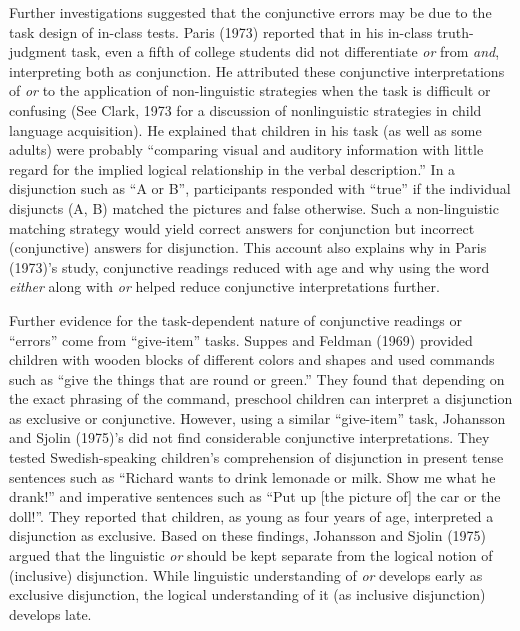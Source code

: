 \documentclass[,man,floatsintext]{apa6}
\begin{document}
Further investigations suggested that the conjunctive errors may be due to the task design of in-class tests. Paris (1973) reported that in his in-class truth-judgment task, even a fifth of college students did not differentiate \emph{or} from \emph{and}, interpreting both as conjunction. He attributed these conjunctive interpretations of \emph{or} to the application of non-linguistic strategies when the task is difficult or confusing (See Clark, 1973 for a discussion of nonlinguistic strategies in child language acquisition). He explained that children in his task (as well as some adults) were probably \enquote{comparing visual and auditory information with little regard for the implied logical relationship in the verbal description.} In a disjunction such as \enquote{A or B}, participants responded with \enquote{true} if the individual disjuncts (A, B) matched the pictures and false otherwise. Such a non-linguistic matching strategy would yield correct answers for conjunction but incorrect (conjunctive) answers for disjunction. This account also explains why in Paris (1973)'s study, conjunctive readings reduced with age and why using the word \emph{either} along with \emph{or} helped reduce conjunctive interpretations further.

Further evidence for the task-dependent nature of conjunctive readings or \enquote{errors} come from \enquote{give-item} tasks. Suppes and Feldman (1969) provided children with wooden blocks of different colors and shapes and used commands such as \enquote{give the things that are round or green.} They found that depending on the exact phrasing of the command, preschool children can interpret a disjunction as exclusive or conjunctive. However, using a similar \enquote{give-item} task, Johansson and Sjolin (1975)'s did not find considerable conjunctive interpretations. They tested Swedish-speaking children's comprehension of disjunction in present tense sentences such as \enquote{Richard wants to drink lemonade or milk. Show me what he drank!} and imperative sentences such as \enquote{Put up {[}the picture of{]} the car or the doll!}. They reported that children, as young as four years of age, interpreted a disjunction as exclusive. Based on these findings, Johansson and Sjolin (1975) argued that the linguistic \emph{or} should be kept separate from the logical notion of (inclusive) disjunction. While linguistic understanding of \emph{or} develops early as exclusive disjunction, the logical understanding of it (as inclusive disjunction) develops late.
\end{document}
